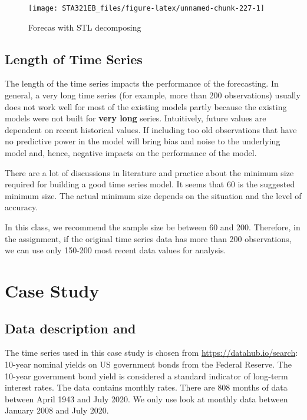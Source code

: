 \documentclass[
]{book}
\begin{document}
\begin{figure}

{\centering \texttt{[image: STA321EB\_files/figure-latex/unnamed-chunk-227-1]} 

}

\caption{Forecas with STL decomposing}\label{fig:unnamed-chunk-227}
\end{figure}

\hypertarget{length-of-time-series}{%
\subsection{Length of Time Series}\label{length-of-time-series}}

The length of the time series impacts the performance of the forecasting. In general, a very long time series (for example, more than 200 observations) usually does not work well for most of the existing models partly because the existing models were not built for \textbf{very long} series. Intuitively, future values are dependent on recent historical values. If including too old observations that have no predictive power in the model will bring bias and noise to the underlying model and, hence, negative impacts on the performance of the model.

There are a lot of discussions in literature and practice about the minimum size required for building a good time series model. It seems that 60 is the suggested minimum size. The actual minimum size depends on the situation and the level of accuracy.

In this class, we recommend the sample size be between 60 and 200. Therefore, in the assignment, if the original time series data has more than 200 observations, we can use only 150-200 most recent data values for analysis.

\hypertarget{case-study-2}{%
\section{Case Study}\label{case-study-2}}

\hypertarget{data-description-and}{%
\subsection{Data description and}\label{data-description-and}}

The time series used in this case study is chosen from \url{https://datahub.io/search}: 10-year nominal yields on US government bonds from the Federal Reserve. The 10-year government bond yield is considered a standard indicator of long-term interest rates. The data contains monthly rates. There are 808 months of data between April 1943 and July 2020. We only use look at monthly data between January 2008 and July 2020.
\end{document}
